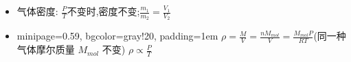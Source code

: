 \documentclass{article}
\begin{document}
\begin{itemize}
\begin{enumerate}
\begin{itemize}
                        \item 固定抽气体积($\triangle{V}$),视为等温扩容
                              $$
                                  P_{0}V_{0} = P_{1}(V_{0}+\triangle {V}) \lra P_{n+1} = \frac{V_{0}}{V_{0} + \triangle{V}} P_{n}
                              $$
                              $$
                                  P_{n} = (\frac{V_{0}}{V_{0} + \triangle{V}})^{n} P_{0}
                              $$
                        \item 按比例抽气($\triangle{V} = k V$),剩余气体重新充满原体积
                              $$
                                  P_{1}V_{1} - P_{1}\triangle V = P_{2}V_{1} \lra  P_nV - P_n\triangle V = P_{n+1}V  \lra P_{n+1} = P_n (1-\frac{\triangle V}{V})
                              $$
                              $$
                                  P_n = P_0 \left(1-\frac{\triangle V}{V}\right)^n = P_0 \left(1-k\right)^n
                              $$
                    \end{itemize}
          \end{enumerate}
    \item 气体密度: $\frac{P}{T}$不变时,密度不变;$\frac{m_{1}}{m_{2}} = \frac{V_{1}}{V_{2}}$
    \item []\vspace{-1em}
          \hspace{-0.9em}
          \begin{adjustbox}{minipage=0.59\linewidth, bgcolor=gray!20, padding=1em}
              \small
              $\rho = \frac{M}{V} = \frac{n M_{mol}}{V} = \frac{M_{mol} P}{RT}$(同一种气体摩尔质量 $M_{mol}$ 不变)
              \quad $\rho \propto \frac{P}{T}$
          \end{adjustbox}
          \vspace{-1em}
\end{itemize}

\vspace{2em}
\end{document}

